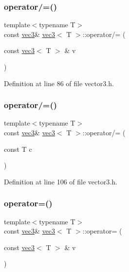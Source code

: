 \subsubsection{\texorpdfstring{operator/=()}{operator/=()}\hspace{0.1cm}{\footnotesize\ttfamily [1/2]}}
{\footnotesize\ttfamily template$<$typename T$>$ \\
const \mbox{\hyperlink{structvec3}{vec3}}\& \mbox{\hyperlink{structvec3}{vec3}}$<$ T $>$\+::operator/= (\begin{DoxyParamCaption}\item[{const \mbox{\hyperlink{structvec3}{vec3}}$<$ T $>$ \&}]{v }\end{DoxyParamCaption})\hspace{0.3cm}{\ttfamily [inline]}}



Definition at line 86 of file vector3.\+h.

\mbox{\label{structvec3_a7641a7bd40a69bad917f423017d8efa6}} 
\subsubsection{\texorpdfstring{operator/=()}{operator/=()}\hspace{0.1cm}{\footnotesize\ttfamily [2/2]}}
{\footnotesize\ttfamily template$<$typename T$>$ \\
const \mbox{\hyperlink{structvec3}{vec3}}\& \mbox{\hyperlink{structvec3}{vec3}}$<$ T $>$\+::operator/= (\begin{DoxyParamCaption}\item[{const T}]{c }\end{DoxyParamCaption})\hspace{0.3cm}{\ttfamily [inline]}}



Definition at line 106 of file vector3.\+h.

\mbox{\label{structvec3_ad2cd7d64d02aa394c736ccc7054e5411}} 
\subsubsection{\texorpdfstring{operator=()}{operator=()}}
{\footnotesize\ttfamily template$<$typename T$>$ \\
const \mbox{\hyperlink{structvec3}{vec3}}\& \mbox{\hyperlink{structvec3}{vec3}}$<$ T $>$\+::operator= (\begin{DoxyParamCaption}\item[{const \mbox{\hyperlink{structvec3}{vec3}}$<$ T $>$ \&}]{v }\end{DoxyParamCaption})\hspace{0.3cm}{\ttfamily [inline]}}




